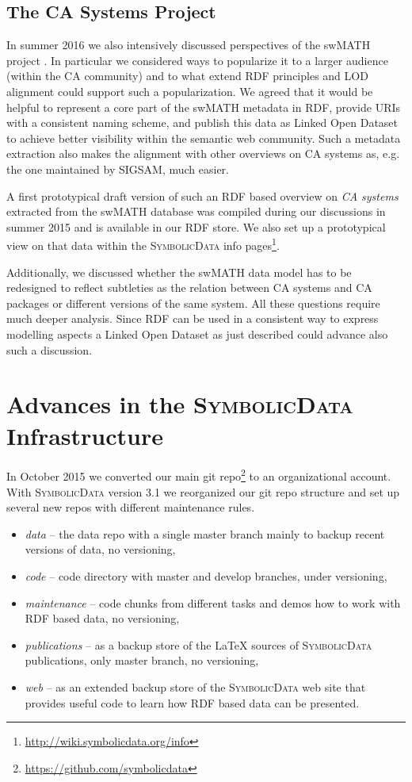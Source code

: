 \documentclass[a4paper,11pt]{article}
\def\SD{\textsc{SymbolicData}}
\begin{document}
\subsection{The CA Systems Project}

In summer 2016 we also intensively discussed perspectives of the swMATH project
\cite{swmath}. In particular we considered ways to popularize it to a larger
audience (within the CA community) and to what extend RDF principles and LOD
alignment could support such a popularization.  We agreed that it would be
helpful to represent a core part of the swMATH metadata in RDF, provide URIs
with a consistent naming scheme, and publish this data as Linked Open Dataset
to achieve better visibility within the semantic web community.  Such a
metadata extraction also makes the alignment with other overviews on CA systems
as, e.g. the one maintained by SIGSAM, much easier.

A first prototypical draft version of such an RDF based overview on \emph{CA
  systems} extracted from the swMATH database was compiled during our
discussions in summer 2015 and is available in our RDF store.  We also set up
a prototypical view on that data within the {\SD} info pages\footnote{
  \url{http://wiki.symbolicdata.org/info}}.

Additionally, we discussed whether the swMATH data model has to be redesigned
to reflect subtleties as the relation between CA systems and CA packages or
different versions of the same system.  All these questions require much deeper
analysis.  Since RDF can be used in a consistent way to express modelling
aspects a Linked Open Dataset as just described could advance also such a
discussion.

\section{Advances in the {\SD} Infrastructure}

In October 2015 we converted our main git repo\footnote{
  \url{https://github.com/symbolicdata}} to an organizational account. With
{\SD} version 3.1 we reorganized our git repo structure and set up several new
repos with different maintenance rules.
\begin{itemize}
\item \emph{data} -- the data repo with a single master branch mainly to backup
  recent versions of data, no versioning,
\item \emph{code} -- code directory with master and develop branches, under
  versioning,
\item \emph{maintenance} -- code chunks from different tasks and demos how to
  work with RDF based data, no versioning,
\item \emph{publications} -- as a backup store of the {\LaTeX} sources of {\SD}
  publications, only master branch, no versioning,
\item \emph{web} -- as an extended backup store of the {\SD} web site that
  provides useful code to learn how RDF based data can be presented.
\end{itemize}
\end{document}
